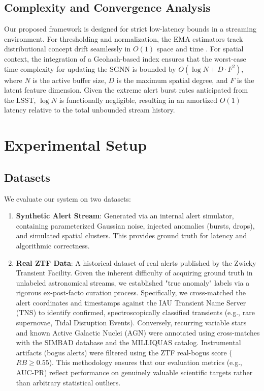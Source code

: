 \documentclass[10pt,journal,compsoc]{IEEEtran}
\begin{document}
\subsection{Complexity and Convergence Analysis}
Our proposed framework is designed for strict low-latency bounds in a streaming environment. For thresholding and normalization, the EMA estimators track distributional concept drift seamlessly in $O(1)$ space and time \cite{robbins1951stochastic, muthukrishnan2005data}. For spatial context, the integration of a Geohash-based index ensures that the worst-case time complexity for updating the SGNN is bounded by $O(\log N + D \cdot F^2)$, where $N$ is the active buffer size, $D$ is the maximum spatial degree, and $F$ is the latent feature dimension. Given the extreme alert burst rates anticipated from the LSST, $\log N$ is functionally negligible, resulting in an amortized $O(1)$ latency relative to the total unbounded stream history.

\section{Experimental Setup}

\subsection{Datasets}
We evaluate our system on two datasets:
\begin{enumerate}
    \item \textbf{Synthetic Alert Stream}: Generated via an internal alert simulator, containing parameterized Gaussian noise, injected anomalies (bursts, drops), and simulated spatial clusters. This provides ground truth for latency and algorithmic correctness.
    \item \textbf{Real ZTF Data}: A historical dataset of real alerts published by the Zwicky Transient Facility. Given the inherent difficulty of acquiring ground truth in unlabeled astronomical streams, we established "true anomaly" labels via a rigorous ex-post-facto curation process. Specifically, we cross-matched the alert coordinates and timestamps against the IAU Transient Name Server (TNS) to identify confirmed, spectroscopically classified transients (e.g., rare supernovae, Tidal Disruption Events). Conversely, recurring variable stars and known Active Galactic Nuclei (AGN) were annotated using cross-matches with the SIMBAD database and the MILLIQUAS catalog. Instrumental artifacts (bogus alerts) were filtered using the ZTF real-bogus score ($RB \ge 0.55$). This methodology ensures that our evaluation metrics (e.g., AUC-PR) reflect performance on genuinely valuable scientific targets rather than arbitrary statistical outliers.
\end{enumerate}
\end{document}
